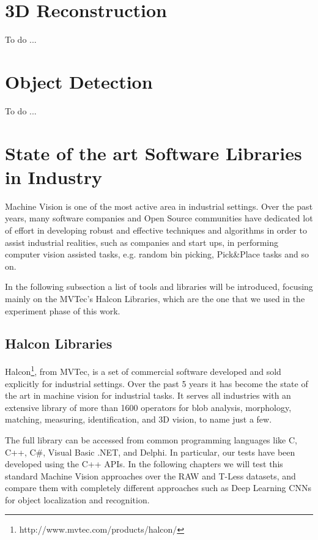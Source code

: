 \section{3D Reconstruction}\label{sec:3dreconstruction}
To do ...

\section{Object Detection}\label{sec:objectdetection}
To do ...

\section{State of the art Software Libraries in Industry}\label{sec:industrylibraries}
Machine Vision is one of the most active area in industrial settings. Over the past years, many software companies and Open Source communities have dedicated lot of effort in developing robust and effective techniques and algorithms in order to assist industrial realities, such as companies and start ups, in performing computer vision assisted tasks, e.g. random bin picking, Pick\&Place tasks and so on.

In the following subsection a list of tools and libraries will be introduced, focusing mainly on the MVTec's Halcon Libraries, which are the one that we used in the experiment phase of this work. 

\subsection{Halcon Libraries}\label{subsec:halconlibs}
Halcon\footnote{http://www.mvtec.com/products/halcon/}, from MVTec, is a set of commercial software developed and sold explicitly for industrial settings. Over the past 5 years it has become the state of the art in machine vision for industrial tasks. It serves all industries with an extensive library of more than 1600 operators for blob analysis, morphology, matching, measuring, identification, and 3D vision, to name just a few.

The full library can be accessed from common programming languages like C, C++, C\#, Visual Basic .NET, and Delphi. In particular, our tests have been developed using the C++ APIs. In the following chapters we will test this standard Machine Vision approaches over the RAW and T-Less datasets, and compare them with completely different approaches such as Deep Learning CNNs for object localization and recognition.

